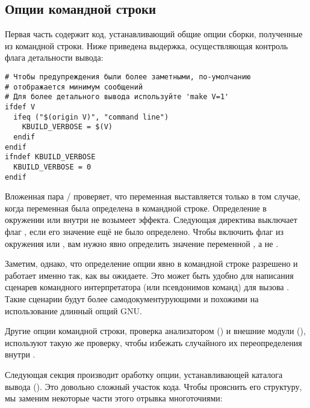 \subsection{Опции командной строки}
Первая часть  содержит код, устанавливающий общие опции
сборки, полученные из командной строки. Ниже приведена выдержка,
осуществляющая контроль флага детальности вывода:

\begin{verbatim}
# Чтобы предупреждения были более заметными, по-умолчанию
# отображается минимум сообщений
# Для более детального вывода используйте 'make V=1'
ifdef V
  ifeq ("$(origin V)", "command line")
    KBUILD_VERBOSE = $(V)
  endif
endif
ifndef KBUILD_VERBOSE
  KBUILD_VERBOSE = 0
endif
\end{verbatim}

Вложенная пара / проверяет, что
переменная  выставляется только в том
случае, когда переменная  была определена в командной
строке. Определение  в окружении или внутри 
не возымеет эффекта. Следующая директива  выключает
флаг , если его значение ещё не было
определено. Чтобы включить флаг из окружения или , вам
нужно явно определить значение переменной ,
а не .

Заметим, однако, что определение опции  явно
в командной строке разрешено и работает именно так, как вы
ожидаете. Это может быть удобно для написания сценарев командного
интерпретатора (или псевдонимов команд) для вызова . Такие
сценарии будут более самодокументурующими и похожими на использование
длинный опций GNU.

Другие опции командной строки, проверка анализатором 
() и внешние модули (), используют такую же
проверку, чтобы избежать случайного их переопределения внутри
.

Следующая секция  производит оработку опции,
устанавливающей каталога вывода (). Это довольно сложный
участок кода. Чтобы прояснить его структуру, мы заменим некоторые
части этого отрывка многоточиями:

